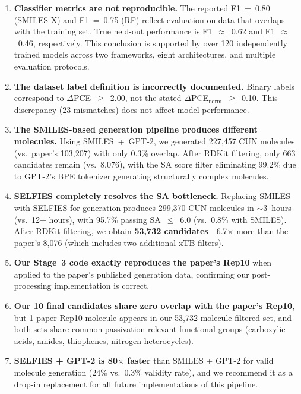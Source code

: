 \documentclass[11pt,a4paper]{article}
\begin{document}
\begin{enumerate}
    \item \textbf{Classifier metrics are not reproducible.} The reported F1~=~0.80 (SMILES-X) and F1~=~0.75 (RF) reflect evaluation on data that overlaps with the training set. True held-out performance is F1~$\approx$~0.62 and F1~$\approx$~0.46, respectively. This conclusion is supported by over 120 independently trained models across two frameworks, eight architectures, and multiple evaluation protocols.

    \item \textbf{The dataset label definition is incorrectly documented.} Binary labels correspond to $\Delta$PCE~$\geq$~2.00, not the stated $\Delta$PCE$_\text{norm}$~$\geq$~0.10. This discrepancy (23 mismatches) does not affect model performance.

    \item \textbf{The SMILES-based generation pipeline produces different molecules.} Using SMILES~+~GPT-2, we generated 227,457 CUN molecules (vs.\ paper's 103,207) with only 0.3\% overlap. After RDKit filtering, only 663 candidates remain (vs.\ 8,076), with the SA score filter eliminating 99.2\% due to GPT-2's BPE tokenizer generating structurally complex molecules.

    \item \textbf{SELFIES completely resolves the SA bottleneck.} Replacing SMILES with SELFIES for generation produces 299,370 CUN molecules in $\sim$3~hours (vs.\ 12+ hours), with 95.7\% passing SA~$\leq$~6.0 (vs.\ 0.8\% with SMILES). After RDKit filtering, we obtain \textbf{53,732 candidates}---6.7$\times$ more than the paper's 8,076 (which includes two additional xTB filters).

    \item \textbf{Our Stage~3 code exactly reproduces the paper's Rep10} when applied to the paper's published generation data, confirming our post-processing implementation is correct.

    \item \textbf{Our 10 final candidates share zero overlap with the paper's Rep10}, but 1 paper Rep10 molecule appears in our 53,732-molecule filtered set, and both sets share common passivation-relevant functional groups (carboxylic acids, amides, thiophenes, nitrogen heterocycles).

    \item \textbf{SELFIES + GPT-2 is 80$\times$ faster} than SMILES + GPT-2 for valid molecule generation (24\% vs.\ 0.3\% validity rate), and we recommend it as a drop-in replacement for all future implementations of this pipeline.
\end{enumerate}
\end{document}
